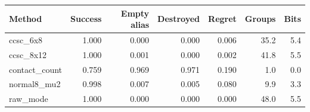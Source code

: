 \begin{tabular}{lrrrrrr}
\toprule
Method & Success & Empty alias & Destroyed & Regret & Groups & Bits \\
\midrule
ccsc\_6x8 & 1.000 & 0.000 & 0.000 & 0.006 & 35.2 & 5.4 \\
ccsc\_8x12 & 1.000 & 0.001 & 0.000 & 0.002 & 41.8 & 5.5 \\
contact\_count & 0.759 & 0.969 & 0.971 & 0.190 & 1.0 & 0.0 \\
normal8\_mu2 & 0.998 & 0.007 & 0.005 & 0.080 & 9.9 & 3.3 \\
raw\_mode & 1.000 & 0.000 & 0.000 & 0.000 & 48.0 & 5.5 \\
\bottomrule
\end{tabular}
